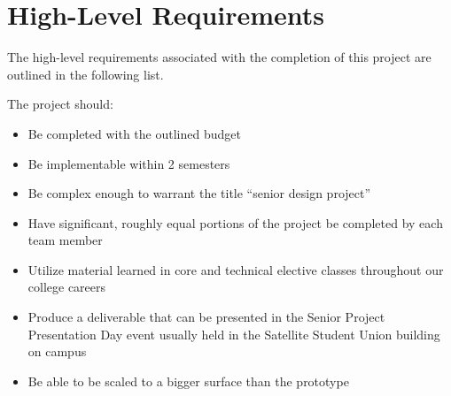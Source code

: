  
 \section{High-Level Requirements}
The high-level requirements associated with the completion of this project are outlined in the following list. \par
\setlength{\parindent}{2.5ex} The project should:
\begin{itemize}
\item Be completed with the outlined budget
\item Be implementable within 2 semesters
\item Be complex enough to warrant the title “senior design project”
\item Have significant, roughly equal portions of the project be completed by each team member
\item Utilize material learned in core and technical elective classes throughout our college careers
\item Produce a deliverable that can be presented in the Senior Project Presentation Day event usually held in the Satellite Student Union building on campus
\item Be able to be scaled to a bigger surface than the prototype
\end{itemize}
 
